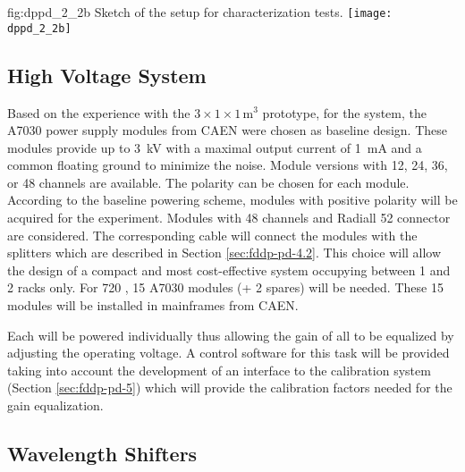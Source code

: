 \begin{dunefigure}{fig:dppd_2_2b}
{Sketch of the setup for  characterization tests.}
\texttt{[image: dppd\_2\_2b]}
\end{dunefigure}

\subsection{High Voltage System}
\label{sec:fddp-pd-2.3}

Based on the experience with the   $3\times1\times1$\,m$^3$ \dual prototype, for the   system, the A7030 power supply modules from CAEN \cite{caen-a7030} were chosen as baseline design. These modules provide up to \SI{3}{kV} with a maximal output current of \SI{1}{mA} and a common floating ground to minimize the noise. Module versions with \num{12}, \num{24}, \num{36}, or \num{48}  channels are available. The  polarity can be chosen for each module. According to the baseline  powering scheme, modules with positive  polarity will be acquired for the experiment. Modules with \num{48}  channels and Radiall \num{52} connector are considered. The corresponding  cable will connect the modules with the  splitters which are described in Section \ref{sec:fddp-pd-4.2}. This choice will allow the design of a compact and most cost-effective system occupying between \num{1} and \num{2} racks only. For \num{720} , \num{15} A7030 modules (+ \num{2} spares) will be needed. These \num{15}  modules will be installed in mainframes from CAEN.

Each  will be powered individually thus allowing the gain of all  to be equalized by adjusting the operating voltage. A control software for this task will be provided taking into account the development of an interface to the  calibration system (Section \ref{sec:fddp-pd-5}) which will provide the calibration factors needed for the gain equalization.

\subsection{Wavelength Shifters}
\label{sec:fddp-pd-2.4}


